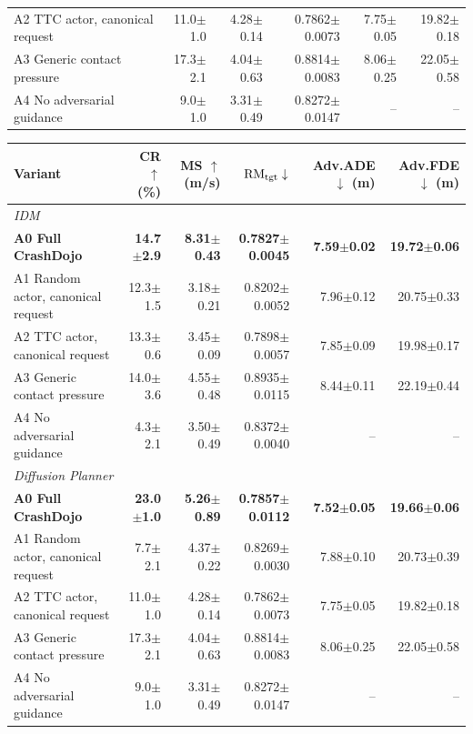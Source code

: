 \begin{table}[t]
{\begin{tabular}{lrrrrr}
A2 TTC actor, canonical request & 11.0$\pm$1.0 & 4.28$\pm$0.14 & 0.7862$\pm$0.0073 & 7.75$\pm$0.05 & 19.82$\pm$0.18\\
A3 Generic contact pressure & 17.3$\pm$2.1 & 4.04$\pm$0.63 & 0.8814$\pm$0.0083 & 8.06$\pm$0.25 & 22.05$\pm$0.58\\
A4 No adversarial guidance & 9.0$\pm$1.0 & 3.31$\pm$0.49 & 0.8272$\pm$0.0147 & -- & --\\
\bottomrule
\end{tabular}}%
\setlength{\tabcolsep}{\dimexpr(\textwidth-\wd\cdtabbox)/12\relax}%
\begin{tabular}{lrrrrr}
\toprule
Variant & CR $\uparrow$ (\%) & MS $\uparrow$ (m/s) & $\mathrm{RM}_{\rm tgt}\downarrow$ & Adv.ADE $\downarrow$ (m) & Adv.FDE $\downarrow$ (m)\\
\midrule
\multicolumn{6}{l}{\textit{IDM}}\\
\rowcolor{oursrow}\textbf{A0 Full CrashDojo} & \textbf{14.7$\pm$2.9} & \textbf{8.31$\pm$0.43} & \textbf{0.7827$\pm$0.0045} & \textbf{7.59$\pm$0.02} & \textbf{19.72$\pm$0.06}\\
A1 Random actor, canonical request & 12.3$\pm$1.5 & 3.18$\pm$0.21 & 0.8202$\pm$0.0052 & 7.96$\pm$0.12 & 20.75$\pm$0.33\\
A2 TTC actor, canonical request & 13.3$\pm$0.6 & 3.45$\pm$0.09 & 0.7898$\pm$0.0057 & 7.85$\pm$0.09 & 19.98$\pm$0.17\\
A3 Generic contact pressure & 14.0$\pm$3.6 & 4.55$\pm$0.48 & 0.8935$\pm$0.0115 & 8.44$\pm$0.11 & 22.19$\pm$0.44\\
A4 No adversarial guidance & 4.3$\pm$2.1 & 3.50$\pm$0.49 & 0.8372$\pm$0.0040 & -- & --\\
\midrule
\multicolumn{6}{l}{\textit{Diffusion Planner}}\\
\rowcolor{oursrow}\textbf{A0 Full CrashDojo} & \textbf{23.0$\pm$1.0} & \textbf{5.26$\pm$0.89} & \textbf{0.7857$\pm$0.0112} & \textbf{7.52$\pm$0.05} & \textbf{19.66$\pm$0.06}\\
A1 Random actor, canonical request & 7.7$\pm$2.1 & 4.37$\pm$0.22 & 0.8269$\pm$0.0030 & 7.88$\pm$0.10 & 20.73$\pm$0.39\\
A2 TTC actor, canonical request & 11.0$\pm$1.0 & 4.28$\pm$0.14 & 0.7862$\pm$0.0073 & 7.75$\pm$0.05 & 19.82$\pm$0.18\\
A3 Generic contact pressure & 17.3$\pm$2.1 & 4.04$\pm$0.63 & 0.8814$\pm$0.0083 & 8.06$\pm$0.25 & 22.05$\pm$0.58\\
A4 No adversarial guidance & 9.0$\pm$1.0 & 3.31$\pm$0.49 & 0.8272$\pm$0.0147 & -- & --\\
\bottomrule
\end{tabular}\endgroup
\end{table}
